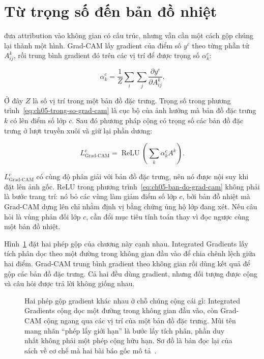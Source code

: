 \section{Từ trọng số đến bản đồ nhiệt}
\label{sec:ch05-ban-do-nhiet}

 đưa attribution vào không gian có cấu
trúc, nhưng vẫn cần một cách gộp chúng lại thành một hình. Grad-CAM lấy
gradient của điểm số $y^c$ theo từng phần tử
$A^k_{ij}$, rồi trung bình gradient đó trên các vị trí để được trọng số
$\alpha_k^c$:

\begin{equation}
\label{eq:ch05-trong-so-grad-cam}
\alpha_k^c=\frac{1}{Z}\sum_i\sum_j
\frac{\partial y^c}{\partial A^k_{ij}}.
\end{equation}

Ở đây $Z$ là số vị trí trong một bản đồ đặc trưng. Trọng số trong
phương trình~\ref{eq:ch05-trong-so-grad-cam} là
 cục bộ của ảnh hưởng mà bản đồ
đặc trưng $k$ có lên điểm số lớp $c$. Sau đó phương pháp cộng có trọng số các
bản đồ đặc trưng ở lượt truyền xuôi và giữ lại phần dương:

\begin{equation}
\label{eq:ch05-ban-do-grad-cam}
L^c_{\mathrm{Grad\mbox{-}CAM}}=\operatorname{ReLU}
\left(\sum_k \alpha_k^c A^k\right).
\end{equation}

%
 $L^c_{\mathrm{Grad\mbox{-}CAM}}$ có cùng độ phân
giải với bản đồ đặc trưng, nên nó được nội suy khi đặt lên ảnh gốc. ReLU trong
phương trình~\ref{eq:ch05-ban-do-grad-cam} không phải là bước trang trí: nó bỏ
các vùng làm giảm điểm số lớp $c$, bởi bản đồ nhiệt mà Grad-CAM dựng lên chỉ
nhằm định vị bằng chứng ủng hộ lớp đang xét. Nếu câu hỏi là vùng phản đối lớp
$c$, cần đổi mục tiêu tính toán thay vì đọc ngược cùng một bản đồ nhiệt.

Hình~\ref{fig:ch05-hai-phep-tich} đặt hai phép gộp của chương này cạnh nhau.
Integrated Gradients lấy tích phân dọc theo một đường trong không gian đầu
vào để chia chênh lệch giữa hai điểm. Grad-CAM trung bình gradient theo không
gian rồi dùng kết quả để gộp các bản đồ đặc trưng. Cả hai đều dùng gradient,
nhưng đối tượng được cộng và câu hỏi được trả lời không giống nhau.

\begin{figure}[htbp]
  \centering
  
  \caption{Hai phép gộp gradient khác nhau ở chỗ chúng cộng cái gì: Integrated
  Gradients cộng dọc một đường trong không gian đầu vào, còn Grad-CAM cộng
  ngang qua các vị trí của một bản đồ đặc trưng. Mũi tên mang nhãn
  \enquote{phép lấy giới hạn} là bước lấy tích phân, phần duy nhất không phải
  một phép cộng hữu hạn. Sơ đồ là bản đọc lại của sách về cơ chế mà hai bài báo
  gốc mô tả~\autocite{p11ig,p12gradcam}.}
  \label{fig:ch05-hai-phep-tich}
\end{figure}

